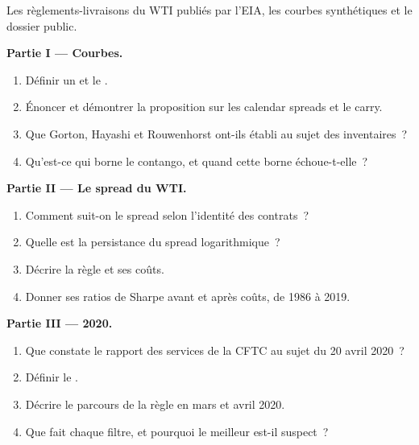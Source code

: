 \begin{problem}\label{pb:s1:calendar-spreads-and-curve-trades:1}
Les règlements-livraisons du WTI publiés par l'EIA, les courbes synthétiques et le dossier public.

\medskip\noindent\textbf{Partie I --- Courbes.}
\begin{enumerate}
\item Définir un  et le .
\item Énoncer et démontrer la proposition sur les calendar spreads et le carry.
\item Que Gorton, Hayashi et Rouwenhorst ont-ils établi au sujet des inventaires~?
\item Qu'est-ce qui borne le contango, et quand cette borne échoue-t-elle~?
\end{enumerate}

\medskip\noindent\textbf{Partie II --- Le spread du WTI.}
\begin{enumerate}[resume]
\item Comment suit-on le spread selon l'identité des contrats~?
\item Quelle est la persistance du spread logarithmique~?
\item Décrire la règle et ses coûts.
\item Donner ses ratios de Sharpe avant et après coûts, de 1986 à 2019.
\end{enumerate}

\medskip\noindent\textbf{Partie III --- 2020.}
\begin{enumerate}[resume]
\item Que constate le rapport des services de la CFTC au sujet du 20 avril 2020~?
\item Définir le .
\item Décrire le parcours de la règle en mars et avril 2020.
\item Que fait chaque filtre, et pourquoi le meilleur est-il suspect~?
\end{enumerate}


\end{problem}
